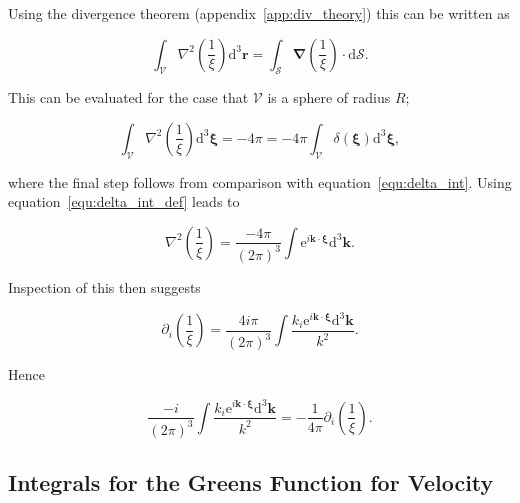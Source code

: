 \documentclass[12pt]{article}
\begin{document}
Using the divergence theorem (appendix~\ref{app:div_theory}) this can be written as

\begin{equation}
\label{equ:sint_del_recip}
\int_{\mathcal{V}} \nabla^{2} \left(\frac{1}{\xi}\right) \mathrm{d} ^{3} \boldsymbol{r} = \int_{\mathcal{S}} \boldsymbol{\nabla} \left(\frac{1}{\xi}\right) \cdot \mathrm{d} \mathcal{S} .
\end{equation}

This can be evaluated for the case that $\mathcal{V}$ is a sphere of radius $R$;

\begin{equation}
\label{equ:int_del_recip_eval}
\int_{\mathcal{V}} \nabla^{2} \left(\frac{1}{\xi}\right) \mathrm{d} ^{3} \boldsymbol{\xi} = - 4 \pi = -4 \pi \int_{\mathcal{V}} \delta(\boldsymbol{\xi}) \mathrm{d}^{3} \boldsymbol{\xi} ,
\end{equation}

where the final step follows from comparison with equation~\ref{equ:delta_int}. Using equation~\ref{equ:delta_int_def} leads to

\begin{equation}
\label{equ:del_square_recip}
\nabla^{2} \left(\frac{1}{\xi}\right) = \frac{-4 \pi}{(2 \pi)^{3}} \int \mathrm{e}^{i \boldsymbol{k} \cdot \boldsymbol{\xi}} \mathrm{d}^{3} \boldsymbol{k} .
\end{equation}

Inspection of this then suggests

\begin{equation}
\label{equ:grad_recip}
\partial_{i} \left(\frac{1}{\xi}\right) = \frac{4 i \pi}{(2 \pi)^{3}} \int \frac{ k_{i} \mathrm{e}^{i \boldsymbol{k} \cdot \boldsymbol{\xi}} \mathrm{d}^{3} \boldsymbol{k}}{k^{2}} .
\end{equation}

Hence

\begin{equation}
\label{equ:green_p_ident}
\frac{-i}{(2 \pi)^{3}} \int \frac{ k_{i} \mathrm{e}^{i \boldsymbol{k} \cdot \boldsymbol{\xi}} \mathrm{d}^{3} \boldsymbol{k}}{k^{2}} = -\frac{1}{4 \pi} \partial_{i} \left(\frac{1}{\xi}\right) .
\end{equation}

\subsection{Integrals for the Greens Function for Velocity}
\label{sub_app:green_vel}
\end{document}
